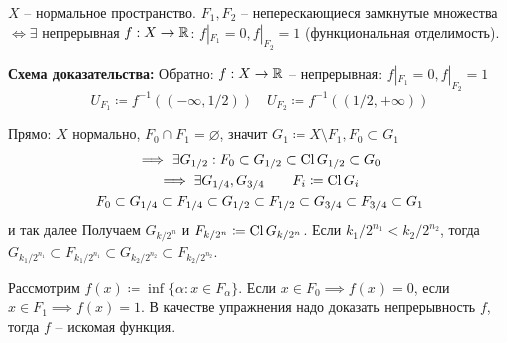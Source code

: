 \documentclass[main]{subfiles}
\begin{document}
\begin{theorem}[Урысон]
    $X$ -- нормальное пространство. $F_1, F_2$ -- неперескающиеся замкнутые множества
    $\Leftrightarrow \exists$ непрерывная $f: X \to \mathbb{R}$:
    $f|_{F_1} = 0, f|_{F_2} = 1$ (функциональная отделимость).
\end{theorem}

\textbf{Схема доказательства:}
Обратно: $f: X \to \mathbb{R}$ -- непрерывная: $f|_{F_1} = 0, f|_{F_2} = 1$
\[U_{F_1} \coloneqq f^{-1}((-\infty, 1/2)) \quad U_{F_2} \coloneqq f^{-1}((1/2, +\infty))\]

Прямо: $X$ нормально, $F_0 \cap F_1 = \varnothing$, значит
$G_1 \coloneqq X \setminus F_1, F_0 \subset G_1$
\begin{gather*}
    \implies \exists G_{1/2}: F_0 \subset G_{1/2} \subset \operatorname{Cl} G_{1/2} \subset G_0\\
    \implies \exists G_{1/4}, G_{3/4} \qquad F_i \coloneqq \operatorname{Cl} G_i\\
    F_0 \subset G_{1/4} \subset F_{1/4} \subset G_{1/2} \subset F_{1/2} \subset G_{3/4} \subset F_{3/4} \subset G_1
\end{gather*}
и так далее
Получаем $G_{k/2^n}$ и $F_{k/2^n} \coloneqq \operatorname{Cl} G_{k/2^n}$.
Если $k_1/2^{n_1} < k_2/2^{n_2}$, тогда $G_{k_1/2^{n_1}} \subset F_{k_1/2^{n_1}} \subset G_{k_2/2^{n_2}} \subset F_{k_2/2^{n_2}}$.

Рассмотрим $f(x) \coloneqq \inf\{\alpha: x \in F_\alpha\}$.
Если $x \in F_0 \implies f(x) = 0$, если $x \in F_1 \implies f(x) = 1$.
В качестве упражнения надо доказать непрерывность $f$, тогда $f$ -- искомая функция.
\end{document}
